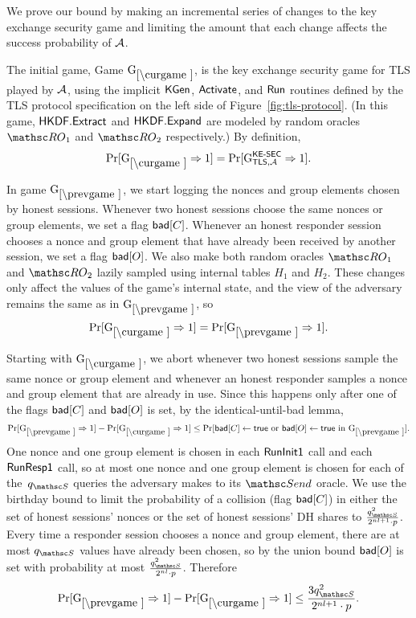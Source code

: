 \iffull
\begin{collectinmacro}{\TLSProofFull}{}{} %
We prove our bound by making an incremental series of changes to the key exchange security game and limiting the amount that each change affects the success probability of $\mathcal{A}$. 


The initial game, Game $\curGm$, is the key exchange security game for TLS played by $\mathcal{A}$, using the implicit $\mathsf{KGen}$, $\mathsf{Activate}$, and $\mathsf{Run}$ routines defined by the TLS protocol specification on the left side of Figure~\ref{fig:tls-protocol}.
(In this game, $\mathsf{HKDF}.\mathsf{Extract}$ and $\mathsf{HKDF}.\mathsf{Expand}$ are modeled by random oracles $\RO_1$ and $\RO_2$ respectively.)
By definition, 
\[\Pr[\curGm\Rightarrow 1] = \Pr[ \Gm^{\KESEC}_{\TLS,\advA} \Rightarrow 1 ].\]


In game $\prevGm$, we start logging the nonces and group elements chosen by honest sessions. Whenever two honest sessions choose the same nonces or group elements, we set a flag $\mathsf{bad}[C]$. Whenever an honest responder session chooses a nonce and group element that have already been received by another session, we set a flag $\mathsf{bad}[O]$. We also make both random oracles $\RO_1$ and $\RO_2$ lazily sampled using internal tables $H_1$ and $H_2$. These changes only affect the values of the game's internal state, and the view of the adversary remains the same as in $\prevGm$, so 
\[ \Pr[\curGm\Rightarrow 1] = \Pr[\prevGm \Rightarrow 1]. \]


Starting with $\curGm$, we abort whenever two honest sessions sample the same nonce or group element and whenever an honest responder samples a nonce and group element that are already in use. Since this happens only after one of the flags $\mathsf{bad}[C]$ and $\mathsf{bad}[O]$ is set, by the identical-until-bad lemma,
\[\Pr[\prevGm*\Rightarrow 1] - \Pr[\curGm*\Rightarrow 1] \leq \Pr[\bad[C] \gets \true\text{ or }\bad[O]\gets \true \text{ in }\prevGm].\]
One nonce and one group element is chosen in each $\mathsf{RunInit1}$ call and each $\mathsf{RunResp1}$ call, so at most one nonce and one group element is chosen for each of the~$\qSend$ queries the adversary makes to its $\Send$ oracle.
We use the birthday bound to limit the probability of a collision (flag $\mathsf{bad}[C]$) in either the set of honest sessions' nonces or the set of honest sessions' DH shares to $\frac{\qSend^2}{2^{\nl+1}\cdot p}$. Every time a responder session chooses a nonce and group element, there are at most $\qSend$ values have already been chosen, so by the union bound $\mathsf{bad}[O]$ is set with probability at most $\frac{\qSend^2}{2^{\nl}\cdot p}$.  Therefore
\[
	\Pr[ \prevGm* \Rightarrow 1] - \Pr[ \curGm* \Rightarrow 1] \leq \frac{3\qSend^2}{2^{\nl+1}\cdot p}.
\]


\end{collectinmacro}
